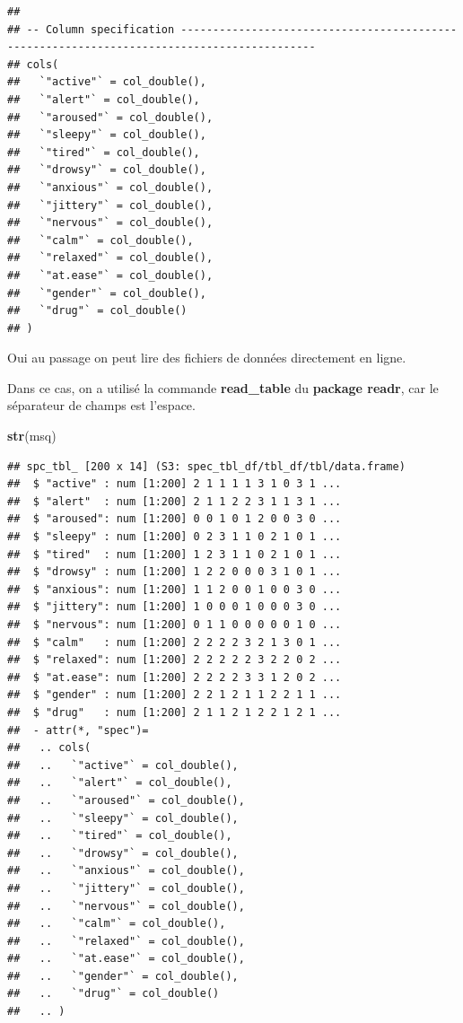 \documentclass[
]{book}
\newenvironment{Shaded}{\begin{snugshade}}{\end{snugshade}}
\newcommand{\FunctionTok}[1]{\textcolor[rgb]{0.13,0.29,0.53}{\textbf{#1}}}
\newcommand{\NormalTok}[1]{#1}
\begin{document}
\begin{verbatim}
## 
## -- Column specification -------------------------------------------------------------------------------------------
## cols(
##   `"active"` = col_double(),
##   `"alert"` = col_double(),
##   `"aroused"` = col_double(),
##   `"sleepy"` = col_double(),
##   `"tired"` = col_double(),
##   `"drowsy"` = col_double(),
##   `"anxious"` = col_double(),
##   `"jittery"` = col_double(),
##   `"nervous"` = col_double(),
##   `"calm"` = col_double(),
##   `"relaxed"` = col_double(),
##   `"at.ease"` = col_double(),
##   `"gender"` = col_double(),
##   `"drug"` = col_double()
## )
\end{verbatim}

Oui au passage on peut lire des fichiers de données directement en ligne.

Dans ce cas, on a utilisé la commande \textbf{read\_table} du \textbf{package readr}, car
le séparateur de champs est l'espace.

\begin{Shaded}
\begin{Highlighting}[]
\FunctionTok{str}\NormalTok{(msq)}
\end{Highlighting}
\end{Shaded}

\begin{verbatim}
## spc_tbl_ [200 x 14] (S3: spec_tbl_df/tbl_df/tbl/data.frame)
##  $ "active" : num [1:200] 2 1 1 1 1 3 1 0 3 1 ...
##  $ "alert"  : num [1:200] 2 1 1 2 2 3 1 1 3 1 ...
##  $ "aroused": num [1:200] 0 0 1 0 1 2 0 0 3 0 ...
##  $ "sleepy" : num [1:200] 0 2 3 1 1 0 2 1 0 1 ...
##  $ "tired"  : num [1:200] 1 2 3 1 1 0 2 1 0 1 ...
##  $ "drowsy" : num [1:200] 1 2 2 0 0 0 3 1 0 1 ...
##  $ "anxious": num [1:200] 1 1 2 0 0 1 0 0 3 0 ...
##  $ "jittery": num [1:200] 1 0 0 0 1 0 0 0 3 0 ...
##  $ "nervous": num [1:200] 0 1 1 0 0 0 0 0 1 0 ...
##  $ "calm"   : num [1:200] 2 2 2 2 3 2 1 3 0 1 ...
##  $ "relaxed": num [1:200] 2 2 2 2 2 3 2 2 0 2 ...
##  $ "at.ease": num [1:200] 2 2 2 2 3 3 1 2 0 2 ...
##  $ "gender" : num [1:200] 2 2 1 2 1 1 2 2 1 1 ...
##  $ "drug"   : num [1:200] 2 1 1 2 1 2 2 1 2 1 ...
##  - attr(*, "spec")=
##   .. cols(
##   ..   `"active"` = col_double(),
##   ..   `"alert"` = col_double(),
##   ..   `"aroused"` = col_double(),
##   ..   `"sleepy"` = col_double(),
##   ..   `"tired"` = col_double(),
##   ..   `"drowsy"` = col_double(),
##   ..   `"anxious"` = col_double(),
##   ..   `"jittery"` = col_double(),
##   ..   `"nervous"` = col_double(),
##   ..   `"calm"` = col_double(),
##   ..   `"relaxed"` = col_double(),
##   ..   `"at.ease"` = col_double(),
##   ..   `"gender"` = col_double(),
##   ..   `"drug"` = col_double()
##   .. )
\end{verbatim}
\end{document}
